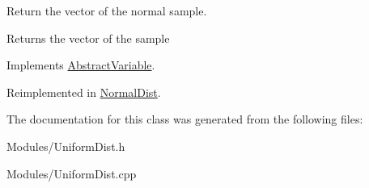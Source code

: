 Return the vector of the normal sample. 

\begin{DoxyReturn}{Returns}
the vector of the sample 
\end{DoxyReturn}


Implements \hyperlink{classAbstractVariable_a0312a988d8c527d2af7615ef2fd08621}{Abstract\+Variable}.



Reimplemented in \hyperlink{classNormalDist_a473e67b9d1787f6ff887f6854dbd350c}{Normal\+Dist}.



The documentation for this class was generated from the following files\+:\begin{DoxyCompactItemize}
\item 
Modules/Uniform\+Dist.\+h\item 
Modules/Uniform\+Dist.\+cpp\end{DoxyCompactItemize}
